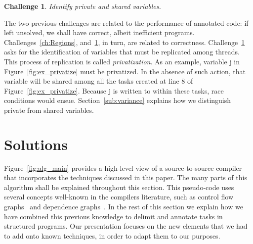 \documentclass[sigplan,10pt,screen]{acmart}
\newtheorem{Challenge}{Challenge}[section]
\begin{document}
\begin{Challenge}
\label{ch:privatize}
Identify private and shared variables.
\end{Challenge}

The two previous challenges are related to the performance of annotated
code: if left unsolved, we shall have correct, albeit inefficient programs.
Challenges~\ref{ch:Regions}, and~\ref{ch:privatize}, in turn, are
related to correctness.
Challenge~\ref{ch:privatize} asks for the identification of variables that
must be replicated among threads.
This process of replication is called {\em privatization}.
As an example, variable \textsf{j} in Figure~\ref{fig:ex_privatize} must
be privatized.
In the absence of such action, that variable will be shared among all the
tasks created at line 8 of Figure~\ref{fig:ex_privatize}.
Because \textsf{j} is written to within these tasks, race conditions would
ensue.
Section~\ref{sub:variance} explains how we distinguish private from
shared variables.




\section{Solutions}
\label{sec:sol}

Figure~\ref{fig:alg_main} provides a high-level view of a source-to-source
compiler that incorporates the techniques discussed in this paper.
The many parts of this algorithm shall be explained throughout this section.
This pseudo-code uses several concepts well-known in the compilers
literature, such as control flow graphs~\cite{Kildall73} and
dependence graphs~\cite{Ferrante87}.
In the rest of this section we explain how we have combined this previous
knowledge to delimit and annotate tasks in structured programs.
Our presentation focuses on the new elements that we had to add onto known
techniques, in order to adapt them to our purposes.
\end{document}
